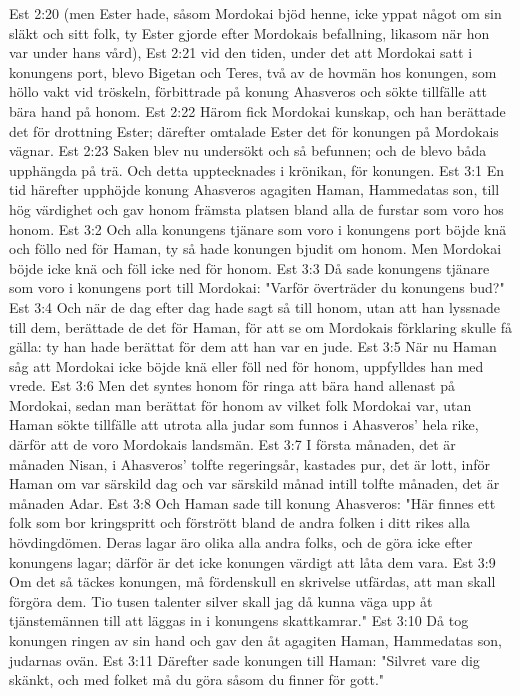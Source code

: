 Est 2:20  (men Ester hade, såsom Mordokai bjöd henne, icke yppat något om sin släkt och sitt folk, ty Ester gjorde efter Mordokais befallning, likasom när hon var under hans vård),
Est 2:21  vid den tiden, under det att Mordokai satt i konungens port, blevo Bigetan och Teres, två av de hovmän hos konungen, som höllo vakt vid tröskeln, förbittrade på konung Ahasveros och sökte tillfälle att bära hand på honom.
Est 2:22  Härom fick Mordokai kunskap, och han berättade det för drottning Ester; därefter omtalade Ester det för konungen på Mordokais vägnar.
Est 2:23  Saken blev nu undersökt och så befunnen; och de blevo båda upphängda på trä. Och detta upptecknades i krönikan, för konungen.
Est 3:1  En tid härefter upphöjde konung Ahasveros agagiten Haman, Hammedatas son, till hög värdighet och gav honom främsta platsen bland alla de furstar som voro hos honom.
Est 3:2  Och alla konungens tjänare som voro i konungens port böjde knä och föllo ned för Haman, ty så hade konungen bjudit om honom. Men Mordokai böjde icke knä och föll icke ned för honom.
Est 3:3  Då sade konungens tjänare som voro i konungens port till Mordokai: "Varför överträder du konungens bud?"
Est 3:4  Och när de dag efter dag hade sagt så till honom, utan att han lyssnade till dem, berättade de det för Haman, för att se om Mordokais förklaring skulle få gälla: ty han hade berättat för dem att han var en jude.
Est 3:5  När nu Haman såg att Mordokai icke böjde knä eller föll ned för honom, uppfylldes han med vrede.
Est 3:6  Men det syntes honom för ringa att bära hand allenast på Mordokai, sedan man berättat för honom av vilket folk Mordokai var, utan Haman sökte tillfälle att utrota alla judar som funnos i Ahasveros' hela rike, därför att de voro Mordokais landsmän.
Est 3:7  I första månaden, det är månaden Nisan, i Ahasveros' tolfte regeringsår, kastades pur, det är lott, inför Haman om var särskild dag och var särskild månad intill tolfte månaden, det är månaden Adar.
Est 3:8  Och Haman sade till konung Ahasveros: "Här finnes ett folk som bor kringspritt och förstrött bland de andra folken i ditt rikes alla hövdingdömen. Deras lagar äro olika alla andra folks, och de göra icke efter konungens lagar; därför är det icke konungen värdigt att låta dem vara.
Est 3:9  Om det så täckes konungen, må fördenskull en skrivelse utfärdas, att man skall förgöra dem. Tio tusen talenter silver skall jag då kunna väga upp åt tjänstemännen till att läggas in i konungens skattkamrar."
Est 3:10  Då tog konungen ringen av sin hand och gav den åt agagiten Haman, Hammedatas son, judarnas ovän.
Est 3:11  Därefter sade konungen till Haman: "Silvret vare dig skänkt, och med folket må du göra såsom du finner för gott."
